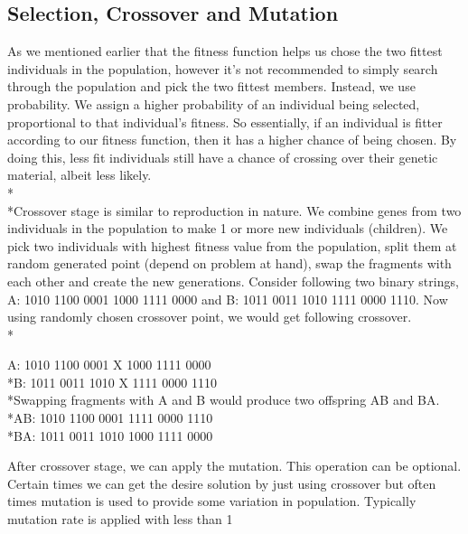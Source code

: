 \subsection*{Selection, Crossover and Mutation}
As we mentioned earlier that the fitness function helps us chose the two fittest individuals in the population, however it’s not recommended to simply search through the population and pick the two fittest members. Instead, we use probability. We assign a higher probability of an individual being selected, proportional to that individual’s fitness. So essentially, if an individual is fitter according to our fitness function, then it has a higher chance of being chosen. By doing this, less fit individuals still have a chance of crossing over their genetic material, albeit less likely. 
\\*\\*Crossover stage is similar to reproduction in nature. We combine genes from two individuals in the population to make 1 or more new individuals (children). We pick two individuals with highest fitness value from the population, split them at random generated point (depend on problem at hand), swap the fragments with each other and create the new generations. Consider following two binary strings, A: 1010 1100 0001 1000 1111 0000 and B: 1011 0011 1010 1111 0000 1110. Now using randomly chosen crossover point, we would get following crossover. 
\\*
\begin{center}
A: 1010 1100 0001 X 1000 1111 0000
\\*B: 1011 0011 1010 X 1111 0000 1110
\vspace{2 mm}
\\*Swapping fragments with A and B would produce two offspring AB and BA.
\vspace{2 mm}
\\*AB: 1010 1100 0001 1111 0000 1110
\\*BA: 1011 0011 1010 1000 1111 0000
\end{center}
After crossover stage, we can apply the mutation. This operation can be optional. Certain times we can get the desire solution by just using crossover but often times mutation is used to provide some variation in population. Typically mutation rate is applied with less than 1%
